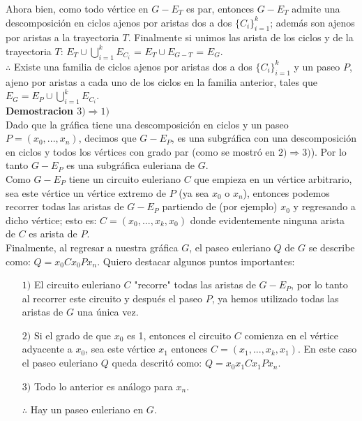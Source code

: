 \documentclass[12pt]{article}
\begin{document}
Ahora bien, como todo vértice en $G - E_T$ es par, entonces $G - E_T$ admite una descomposición en ciclos ajenos  por aristas dos a dos $\{C_i \}_{i=1}^k$; además son ajenos por aristas a la trayectoria $T$. Finalmente si unimos las arista de los ciclos y de la trayectoria $T$:  $E_T \cup \bigcup_{i=1}^k E_{C_i}$ = $E_T \cup E_{G-T} $ = $E_G$.\\

$\therefore$ Existe una familia de ciclos ajenos por aristas dos a dos $\{C_i \}_{i=1}^k$ y un paseo $P$, ajeno por aristas a cada uno de los ciclos en la familia anterior, tales que $E_G = E_P \cup \bigcup_{i=1}^k E_{C_i}$.\\

\textbf{Demostracion $3) \Rightarrow 1)$}\\
Dado que la gráfica tiene una descomposición en ciclos y un paseo $P = (x_0,...,x_n)$, decimos que $G - E_P$, es una subgráfica con una descomposición en ciclos y todos los vértices con grado par (como se mostró en $2) \Rightarrow 3)$). Por lo tanto $G - E_P$ es una subgráfica euleriana de $G$.\\

Como $G - E_P$ tiene un circuito euleriano $C$ que empieza en un vértice arbitrario, sea este vértice un vértice extremo de $P$ (ya sea $x_0$ o $x_n$), entonces podemos recorrer todas las aristas de $G - E_P$ partiendo de (por ejemplo) $x_0$ y regresando a dicho  vértice; esto es: $C = (x_0,...,x_k,x_0)$ donde evidentemente ninguna arista de $C$ es arista de $P$.\\

Finalmente, al regresar a nuestra gráfica $G$, el paseo euleriano $Q$ de $G$ se describe como: $Q = x_0Cx_0Px_n$. Quiero destacar algunos puntos importantes:

\begin{enumerate}

\item[$1)$] El circuito euleriano $C$ "recorre" todas las aristas de  $G - E_P$, por lo tanto al recorrer este circuito y después el paseo $P$, ya hemos utilizado todas las aristas de $G$ una única vez.

\item[$2)$]Si el grado de que $x_0$ es 1, entonces el circuito $C$ comienza en el vértice adyacente a $x_0$, sea este vértice $x_1$ entonces $C = (x_1,...,x_k,x_1)$. En este caso el paseo euleriano $Q$ queda descritó como: $Q = x_0x_1Cx_1Px_n$.

\item[$3)$] Todo lo anterior es análogo para $x_n$.

$\therefore$  Hay un paseo euleriano en $G$.

\end{enumerate}
\end{document}
